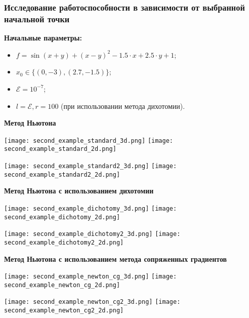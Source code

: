 \documentclass{article}
\begin{document}
\subsubsection*{Исследование работоспособности в зависимости от выбранной начальной точки}
\textbf{Начальные параметры:}
\begin{itemize}
    \item $f = \sin(x + y) + (x - y)^2 - 1.5 \cdot x + 2.5 \cdot y + 1$;
    \item $x_0 \in \{(0, -3), (2.7, -1.5)\}$;
    \item $\mathcal{E} = 10^{-7}$;
    \item $l = \mathcal{E}, r = 100$ (при использовании метода дихотомии).
\end{itemize}
\textbf{Метод Ньютона}
\begin{center}
    \texttt{[image: second\_example\_standard\_3d.png]}
    \texttt{[image: second\_example\_standard\_2d.png]}
    \label{fig:enter-label}
\end{center}
\begin{center}
    \texttt{[image: second\_example\_standard2\_3d.png]}
    \texttt{[image: second\_example\_standard2\_2d.png]}
    \label{fig:enter-label}
\end{center}
\textbf{Метод Ньютона с использованием дихотомии}
\begin{center}
    \texttt{[image: second\_example\_dichotomy\_3d.png]}
    \texttt{[image: second\_example\_dichotomy\_2d.png]}
    \label{fig:enter-label}
\end{center}
\begin{center}
    \texttt{[image: second\_example\_dichotomy2\_3d.png]}
    \texttt{[image: second\_example\_dichotomy2\_2d.png]}
    \label{fig:enter-label}
\end{center}
\textbf{Метод Ньютона с использованием метода сопряженных градиентов}
\begin{center}
    \texttt{[image: second\_example\_newton\_cg\_3d.png]}
    \texttt{[image: second\_example\_newton\_cg\_2d.png]}
    \label{fig:enter-label}
\end{center}
\begin{center}
    \texttt{[image: second\_example\_newton\_cg2\_3d.png]}
    \texttt{[image: second\_example\_newton\_cg2\_2d.png]}
    \label{fig:enter-label}
\end{center}
\end{document}
